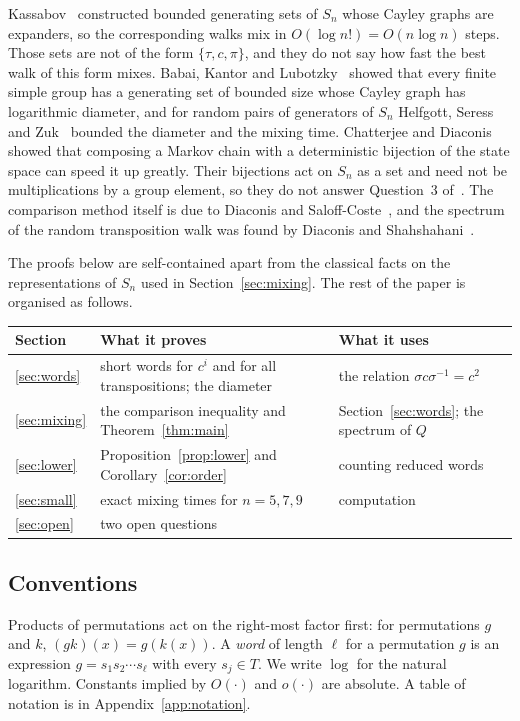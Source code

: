 \documentclass[11pt]{amsart}
\theoremstyle{remark}
\numberwithin{equation}{section}
\begin{document}
Kassabov~\cite{Kassabov} constructed bounded generating sets of $S_n$ whose Cayley graphs are expanders, so the corresponding walks mix in $O(\log n!)=O(n\log n)$ steps. Those sets are not of the form $\{\tau,c,\pi\}$, and they do not say how fast the best walk of this form mixes. Babai, Kantor and Lubotzky~\cite{BKL} showed that every finite simple group has a generating set of bounded size whose Cayley graph has logarithmic diameter, and for random pairs of generators of $S_n$ Helfgott, Seress and Zuk~\cite{HSZ} bounded the diameter and the mixing time. Chatterjee and Diaconis~\cite{CD} showed that composing a Markov chain with a deterministic bijection of the state space can speed it up greatly. Their bijections act on $S_n$ as a set and need not be multiplications by a group element, so they do not answer Question~3 of~\cite{Diaconis13}. The comparison method itself is due to Diaconis and Saloff-Coste~\cite{DSC}, and the spectrum of the random transposition walk was found by Diaconis and Shahshahani~\cite{DS81}.

The proofs below are self-contained apart from the classical facts on the representations of $S_n$ used in Section~\ref{sec:mixing}. The rest of the paper is organised as follows.

\begin{center}\small
\begin{tabular}{@{}lll@{}}\toprule
Section & What it proves & What it uses \\ \midrule
\ref{sec:words} & short words for $c^i$ and for all transpositions; the diameter & the relation $\sigma c\sigma^{-1}=c^2$ \\
\ref{sec:mixing} & the comparison inequality and Theorem~\ref{thm:main} & Section~\ref{sec:words}; the spectrum of $Q$~\cite{DS81} \\
\ref{sec:lower} & Proposition~\ref{prop:lower} and Corollary~\ref{cor:order} & counting reduced words \\
\ref{sec:small} & exact mixing times for $n=5,7,9$ & computation \\
\ref{sec:open} & two open questions & \\ \bottomrule
\end{tabular}
\end{center}

\subsection*{Conventions}
Products of permutations act on the right-most factor first: for permutations $g$ and $k$, $(gk)(x)=g(k(x))$. A \emph{word} of length $\ell$ for a permutation $g$ is an expression $g=s_1s_2\cdots s_\ell$ with every $s_j\in T$. We write $\log$ for the natural logarithm. Constants implied by $O(\cdot)$ and $o(\cdot)$ are absolute. A table of notation is in Appendix~\ref{app:notation}.
\end{document}
